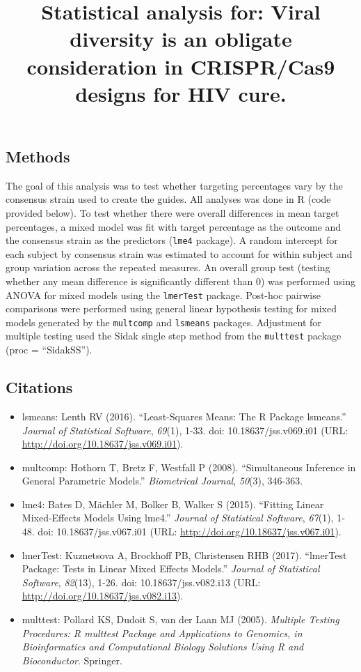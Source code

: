 \documentclass[]{article}
\title{Statistical analysis for: Viral diversity is an obligate consideration
in CRISPR/Cas9 designs for HIV cure.}
\author{}
\date{}
\begin{document}
\maketitle

\subsection{Methods}\label{methods}

The goal of this analysis was to test whether targeting percentages vary
by the consensus strain used to create the guides. All analyses was done
in R (code provided below). To test whether there were overall
differences in mean target percentages, a mixed model was fit with
target percentage as the outcome and the consensus strain as the
predictors (\texttt{lme4} package). A random intercept for each subject
by consensus strain was estimated to account for within subject and
group variation across the repeated measures. An overall group test
(testing whether any mean difference is significantly different than 0)
was performed using ANOVA for mixed models using the \texttt{lmerTest}
package. Post-hoc pairwise comparisons were performed using general
linear hypothesis testing for mixed models generated by the
\texttt{multcomp} and \texttt{lsmeans} packages. Adjustment for multiple
testing used the Sidak single step method from the \texttt{multtest}
package (proc = ``SidakSS'').

\subsection{Citations}\label{citations}

\begin{itemize}
\item
  lsmeans: Lenth RV (2016). ``Least-Squares Means: The R Package
  lsmeans.'' \emph{Journal of Statistical Software}, \emph{69}(1), 1-33.
  doi: 10.18637/jss.v069.i01 (URL:
  \url{http://doi.org/10.18637/jss.v069.i01}).
\item
  multcomp: Hothorn T, Bretz F, Westfall P (2008). ``Simultaneous
  Inference in General Parametric Models.'' \emph{Biometrical Journal},
  \emph{50}(3), 346-363.
\item
  lme4: Bates D, Mächler M, Bolker B, Walker S (2015). ``Fitting Linear
  Mixed-Effects Models Using lme4.'' \emph{Journal of Statistical
  Software}, \emph{67}(1), 1-48. doi: 10.18637/jss.v067.i01 (URL:
  \url{http://doi.org/10.18637/jss.v067.i01}).
\item
  lmerTest: Kuznetsova A, Brockhoff PB, Christensen RHB (2017).
  ``lmerTest Package: Tests in Linear Mixed Effects Models.''
  \emph{Journal of Statistical Software}, \emph{82}(13), 1-26. doi:
  10.18637/jss.v082.i13 (URL:
  \url{http://doi.org/10.18637/jss.v082.i13}).
\item
  multtest: Pollard KS, Dudoit S, van der Laan MJ (2005). \emph{Multiple
  Testing Procedures: R multtest Package and Applications to Genomics,
  in Bioinformatics and Computational Biology Solutions Using R and
  Bioconductor}. Springer.
\end{itemize}
\end{document}
